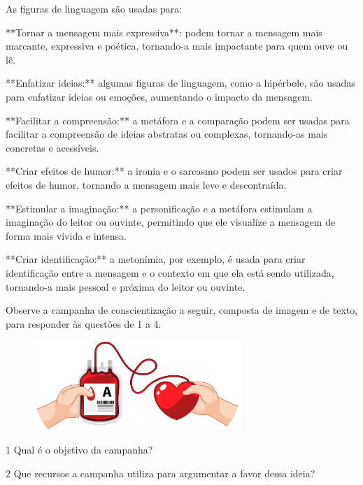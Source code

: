 {As figuras de linguagem são usadas para:

**Tornar a mensagem mais expressiva**: podem tornar a mensagem mais
marcante, expressiva e poética, tornando-a mais impactante para quem
ouve ou lê.

**Enfatizar ideias:** algumas figuras de linguagem, como a hipérbole,
são usadas para enfatizar ideias ou emoções, aumentando o impacto da
mensagem.

**Facilitar a compreensão:** a metáfora e a comparação podem ser usadas
para facilitar a compreensão de ideias abstratas ou complexas,
tornando-as mais concretas e acessíveis.

**Criar efeitos de humor:** a ironia e o sarcasmo podem ser usados para
criar efeitos de humor, tornando a mensagem mais leve e descontraída.

**Estimular a imaginação:** a personificação e a metáfora estimulam a
imaginação do leitor ou ouvinte, permitindo que ele visualize a mensagem
de forma mais vívida e intensa.

**Criar identificação:** a metonímia, por exemplo, é usada para criar
identificação entre a mensagem e o contexto em que ela está sendo
utilizada, tornando-a mais pessoal e próxima do leitor ou ouvinte.}

Observe a campanha de conscientização a seguir, composta de imagem e de
texto, para responder às questões de 1 a 4.

\begin{figure}
\includegraphics[width=0.7\textwidth]{./imgSAEB_6_POR/freepik/PORT_6_IMG-28.jpeg}
\end{figure}

\num{1} Qual é o objetivo da campanha?



\num{2} Que recursos a campanha utiliza para argumentar a favor dessa
ideia?



